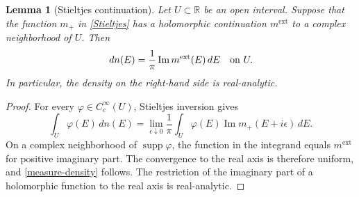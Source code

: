\documentclass[12pt,a4paper]{article}
\numberwithin{equation}{section}
\newcommand{\supp}{\operatorname{supp}}
\newcommand{\R}{\mathbb R}
\renewcommand{\Im}{\operatorname{Im}}
\newtheorem{lem}[thm]{Lemma}
\begin{document}
\begin{lem}[Stieltjes continuation]\label{lem:stieltjes-continuation}
Let $U\subset\R$ be an open interval.  Suppose that the function $m_+$ in
\eqref{Stieltjes} has a holomorphic continuation $m^{\mathrm{ext}}$ to a
complex neighborhood of $U$.  Then
\begin{equation}
 d n(E)=\frac{1}{\pi}\Im m^{\mathrm{ext}}(E)\,d E
 \quad\hbox{on }U.
\label{measure-density}
\end{equation}
In particular, the density on the right-hand side is real-analytic.
\end{lem}

\begin{proof}
For every $\varphi\in C_c^\infty(U)$, Stieltjes inversion gives
\begin{equation}
 \int_U\varphi(E)\,d n(E)
 =\lim_{\epsilon\downarrow0}\frac{1}{\pi}
  \int_U\varphi(E)\Im m_+(E+i\epsilon)\,d E.
\label{test-inversion}
\end{equation}
On a complex neighborhood of $\supp\varphi$, the function in the integrand
equals $m^{\mathrm{ext}}$ for positive imaginary part.  The convergence to
the real axis is therefore uniform, and \eqref{measure-density} follows.
The restriction of the imaginary part of a holomorphic function to the real
axis is real-analytic.
\end{proof}
\end{document}

